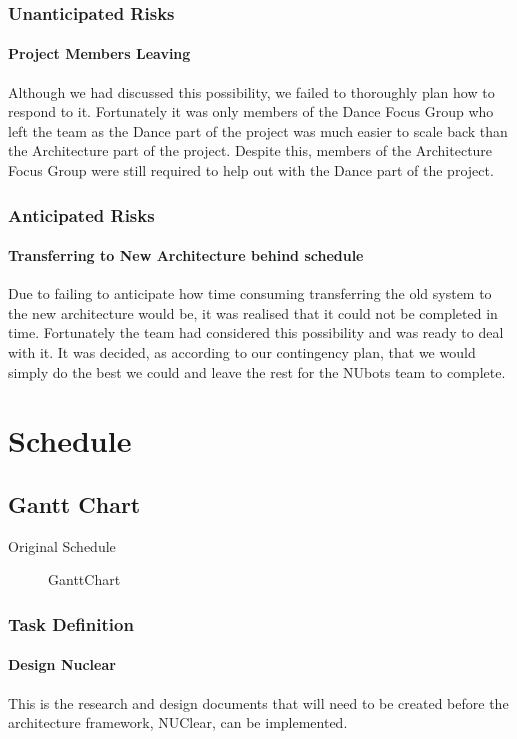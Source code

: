 \documentclass[a4paper]{article}
\begin{document}
			\subsubsection{Unanticipated Risks}
				\paragraph{Project Members Leaving}  
					Although we had discussed this possibility, we failed to thoroughly plan how to respond to it. Fortunately it was only members of the Dance Focus Group who left the team as the Dance part of the project was much easier to scale back than the Architecture part of the project. Despite this, members of the Architecture Focus Group were still required to help out with the Dance part of the project.
			\subsubsection{Anticipated Risks}
				\paragraph{Transferring to New Architecture behind schedule}  
					Due to failing to anticipate how time consuming transferring the old system to the new architecture would be, it was realised that it could not be completed in time. Fortunately the team had considered this possibility and was ready to deal with it. It was decided, as according to our contingency plan, that we would simply do the best we could and leave the rest for the NUbots team to complete.

\newpage
	\section{Schedule}
		\subsection{Gantt Chart}
			Original Schedule
			\begin{figure}[!ht]
				{GanttChart}
			\end{figure}
			\subsubsection{Task Definition}
				\paragraph{Design Nuclear}
					This is the research and design documents that will need to be created before the architecture framework, NUClear, can be implemented.
\end{document}
